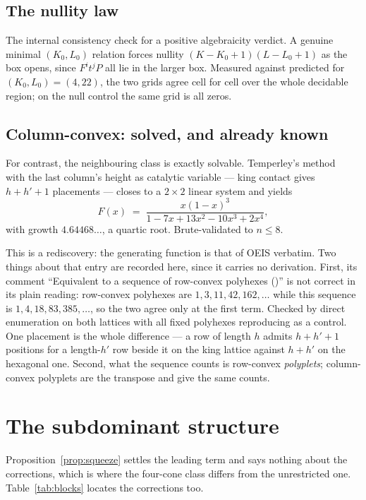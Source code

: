 \documentclass[11pt]{article}
\begin{document}
\subsection{The nullity law}

The internal consistency check for a positive algebraicity verdict. A genuine
minimal $(K_0,L_0)$ relation forces nullity $(K-K_0+1)(L-L_0+1)$ as the box
opens, since $F^it^jP$ all lie in the larger box. Measured against predicted for
$(K_0,L_0) = (4,22)$, the two grids agree cell for cell over the whole decidable
region; on the null control the same grid is all zeros.

\subsection{Column-convex: solved, and already known}

For contrast, the neighbouring class is exactly solvable.
Temperley's method~\cite{temperley1956} with the last column's height as
catalytic variable --- king contact gives $h + h' + 1$ placements --- closes to a
$2\times2$ linear system and yields
\[
  F(x) \;=\; \frac{x(1-x)^3}{1 - 7x + 13x^2 - 10x^3 + 2x^4},
\]
with growth $4.64468\dots$, a quartic root. Brute-validated to $n \le 8$.

This is a rediscovery: the generating function is that of OEIS 
verbatim. Two things about that entry are recorded here, since it carries no
derivation. First, its comment ``Equivalent to a sequence of row-convex
polyhexes ()'' is not correct in its plain reading: row-convex
polyhexes are $1,3,11,42,162,\dots$ while this sequence is $1,4,18,83,385,\dots$,
so the two agree only at the first term. Checked by direct enumeration on both
lattices with all fixed polyhexes reproducing  as a control. One
placement is the whole difference --- a row of length $h$ admits $h + h' + 1$
positions for a length-$h'$ row beside it on the king lattice against $h + h'$
on the hexagonal one. Second, what the sequence counts is row-convex
\emph{polyplets}; column-convex polyplets are the transpose and give the same
counts.

\section{The subdominant structure}
\label{sec:subdominant}

Proposition~\ref{prop:squeeze} settles the leading term and says nothing about
the corrections, which is where the four-cone class differs from the
unrestricted one. Table~\ref{tab:blocks} locates the corrections too.
\end{document}
